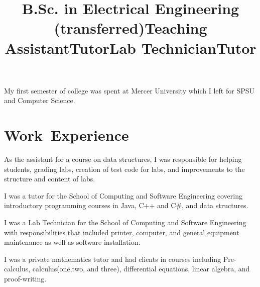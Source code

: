 \documentclass[margintitle,line]{res}
\renewcommand{\subsection}[1]{\section{\normalfont #1}}
\begin{document}
\begin{resume}
\title{B.Sc. in Electrical Engineering (transferred)}
\begin{position}
My first semester of college was spent at Mercer University which I left  for SPSU and Computer Science.
\end{position}


\section{\mbox{Work Experience}}


\title{Teaching Assistant}
\begin{position}
 As the assistant for a course on data structures, I was responsible for helping students, grading labs, creation of test code for labs, and improvements to the structure and content of labs.
\end{position}

\title{Tutor}
\begin{position}
I was a tutor for the School of Computing and Software Engineering covering introductory programming courses in Java, C++ and C\#, and data structures.
\end{position}

\title{Lab Technician}
\begin{position}
I was a Lab Technician  for the School of Computing and Software Engineering with responsibilities that included printer, computer, and general equipment maintenance as well as software installation.
\end{position}

\title{Tutor}
\begin{position}
I was a private mathematics tutor and had clients in courses including Pre-calculus, calculus(one,two, and three), differential equations, linear algebra, and proof-writing.
\end{position}


\end{resume}
\end{document}
